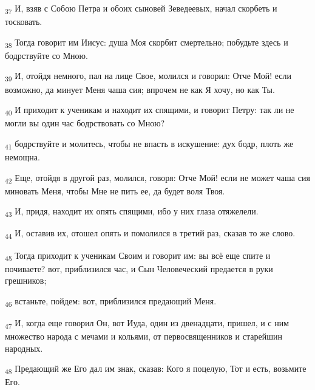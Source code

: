 \begin{tcolorbox}
\textsubscript{37} И, взяв с Собою Петра и обоих сыновей Зеведеевых, начал скорбеть и тосковать.
\end{tcolorbox}
\begin{tcolorbox}
\textsubscript{38} Тогда говорит им Иисус: душа Моя скорбит смертельно; побудьте здесь и бодрствуйте со Мною.
\end{tcolorbox}
\begin{tcolorbox}
\textsubscript{39} И, отойдя немного, пал на лице Свое, молился и говорил: Отче Мой! если возможно, да минует Меня чаша сия; впрочем не как Я хочу, но как Ты.
\end{tcolorbox}
\begin{tcolorbox}
\textsubscript{40} И приходит к ученикам и находит их спящими, и говорит Петру: так ли не могли вы один час бодрствовать со Мною?
\end{tcolorbox}
\begin{tcolorbox}
\textsubscript{41} бодрствуйте и молитесь, чтобы не впасть в искушение: дух бодр, плоть же немощна.
\end{tcolorbox}
\begin{tcolorbox}
\textsubscript{42} Еще, отойдя в другой раз, молился, говоря: Отче Мой! если не может чаша сия миновать Меня, чтобы Мне не пить ее, да будет воля Твоя.
\end{tcolorbox}
\begin{tcolorbox}
\textsubscript{43} И, придя, находит их опять спящими, ибо у них глаза отяжелели.
\end{tcolorbox}
\begin{tcolorbox}
\textsubscript{44} И, оставив их, отошел опять и помолился в третий раз, сказав то же слово.
\end{tcolorbox}
\begin{tcolorbox}
\textsubscript{45} Тогда приходит к ученикам Своим и говорит им: вы всё еще спите и почиваете? вот, приблизился час, и Сын Человеческий предается в руки грешников;
\end{tcolorbox}
\begin{tcolorbox}
\textsubscript{46} встаньте, пойдем: вот, приблизился предающий Меня.
\end{tcolorbox}
\begin{tcolorbox}
\textsubscript{47} И, когда еще говорил Он, вот Иуда, один из двенадцати, пришел, и с ним множество народа с мечами и кольями, от первосвященников и старейшин народных.
\end{tcolorbox}
\begin{tcolorbox}
\textsubscript{48} Предающий же Его дал им знак, сказав: Кого я поцелую, Тот и есть, возьмите Его.
\end{tcolorbox}
